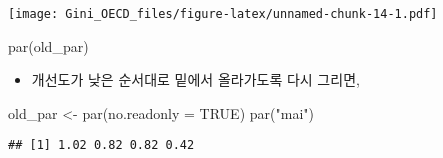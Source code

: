 \documentclass[
]{article}
\newenvironment{Shaded}{\begin{snugshade}}{\end{snugshade}}
\newcommand{\AttributeTok}[1]{\textcolor[rgb]{0.77,0.63,0.00}{#1}}
\newcommand{\ConstantTok}[1]{\textcolor[rgb]{0.00,0.00,0.00}{#1}}
\newcommand{\DecValTok}[1]{\textcolor[rgb]{0.00,0.00,0.81}{#1}}
\newcommand{\FloatTok}[1]{\textcolor[rgb]{0.00,0.00,0.81}{#1}}
\newcommand{\FunctionTok}[1]{\textcolor[rgb]{0.00,0.00,0.00}{#1}}
\newcommand{\NormalTok}[1]{#1}
\newcommand{\OtherTok}[1]{\textcolor[rgb]{0.56,0.35,0.01}{#1}}
\newcommand{\SpecialCharTok}[1]{\textcolor[rgb]{0.00,0.00,0.00}{#1}}
\newcommand{\StringTok}[1]{\textcolor[rgb]{0.31,0.60,0.02}{#1}}
\providecommand{\tightlist}{%
  \setlength{\itemsep}{0pt}\setlength{\parskip}{0pt}}
\begin{document}
\begin{Shaded}
\end{Shaded}

\texttt{[image: Gini\_OECD\_files/figure-latex/unnamed-chunk-14-1.pdf]}

\begin{Shaded}
\begin{Highlighting}[]
\FunctionTok{par}\NormalTok{(old\_par)}
\end{Highlighting}
\end{Shaded}

\begin{itemize}
\tightlist
\item
  개선도가 낮은 순서대로 밑에서 올라가도록 다시 그리면,
\end{itemize}

\begin{Shaded}
\begin{Highlighting}[]
\NormalTok{old\_par }\OtherTok{\textless{}{-}} \FunctionTok{par}\NormalTok{(}\AttributeTok{no.readonly =} \ConstantTok{TRUE}\NormalTok{)}
\FunctionTok{par}\NormalTok{(}\StringTok{"mai"}\NormalTok{)}
\end{Highlighting}
\end{Shaded}

\begin{verbatim}
## [1] 1.02 0.82 0.82 0.42
\end{verbatim}
\end{document}

